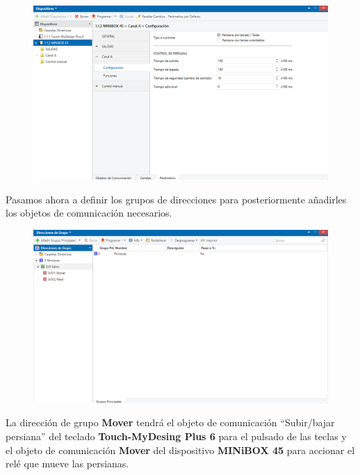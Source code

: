 \documentclass[10pt]{article}
\begin{document}
\begin{figure}[H]
	\begin{center}
	 		\includegraphics[width = 1.00\textwidth]{Imagenes/img40}
	\end{center} 
\end{figure}


Pasamos ahora a definir los grupos de direcciones para posteriormente añadirles los objetos de comunicación necesarios. \\

\begin{figure}[H]
	\begin{center}
	 		\includegraphics[width = 1.00\textwidth]{Imagenes/img41}
	\end{center} 
\end{figure}


La dirección de grupo \textbf{Mover} tendrá el objeto de comunicación ``Subir/bajar persiana'' del teclado \textbf{Touch-MyDesing Plus 6} para el pulsado de las teclas y el objeto de comunicación \textbf{Mover} del dispositivo \textbf{MINiBOX 45} para accionar el relé que mueve las persianas. \\
\end{document}
